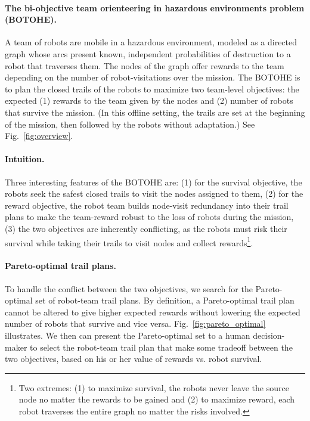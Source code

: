 \documentclass[11pt, oneside]{article}
\begin{document}
\paragraph{The bi-objective team orienteering in hazardous environments problem (BOTOHE).} 
A team of robots are mobile in a hazardous environment, modeled as a directed graph whose arcs present known, independent probabilities of destruction to a robot that traverses them.
The nodes of the graph offer rewards to the team depending on the number of robot-visitations over the mission.
The BOTOHE is to plan the closed trails of the robots to maximize two team-level objectives: the expected
(1) rewards to the team given by the nodes and 
(2) number of robots that survive the mission. 
(In this offline setting, the trails are set at the beginning of the mission, then followed by the robots without adaptation.)
See Fig.~\ref{fig:overview}.

\paragraph{Intuition.} Three interesting features of the BOTOHE are: 
(1) for the survival objective, the robots seek the safest closed trails to visit the nodes assigned to them,
(2) for the reward objective, the robot team builds node-visit redundancy into their trail plans to make the team-reward robust to the loss of robots during the mission,
(3) the two objectives are inherently conflicting, as the robots must risk their survival while taking their trails to visit nodes and collect rewards\footnote{Two extremes: (1) to maximize survival, the robots never leave the source node no matter the rewards to be gained and (2) to maximize reward, each robot traverses the entire graph no matter the risks involved.}.

\paragraph{Pareto-optimal trail plans.}
To handle the conflict between the two objectives, we search for the Pareto-optimal set of robot-team trail plans. By definition, a Pareto-optimal trail plan cannot be altered to give higher expected rewards without lowering the expected number of robots that survive and vice versa. 
Fig.~\ref{fig:pareto_optimal} illustrates.
We then can present the Pareto-optimal set to a human decision-maker to select the robot-team trail plan that make some tradeoff between the two objectives, based on his or her value of rewards vs. robot survival. 
\end{document}
